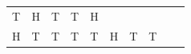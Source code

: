 {\begin{tabular}[t]{|l|l|l|l|l|l|l|l|l|l|}
        T &
        H &
        T &
        T &
        H%
     \tabularnewline\cline{1-1}\cline{2-2}\cline{3-3}\cline{4-4}\cline{5-5}\cline{6-6}\cline{7-7}\cline{8-8}\cline{9-9}\cline{10-10}
        H &
        T &
        T &
        T &
        T &
        H &
        T &
        T &

\end{tabular}}
